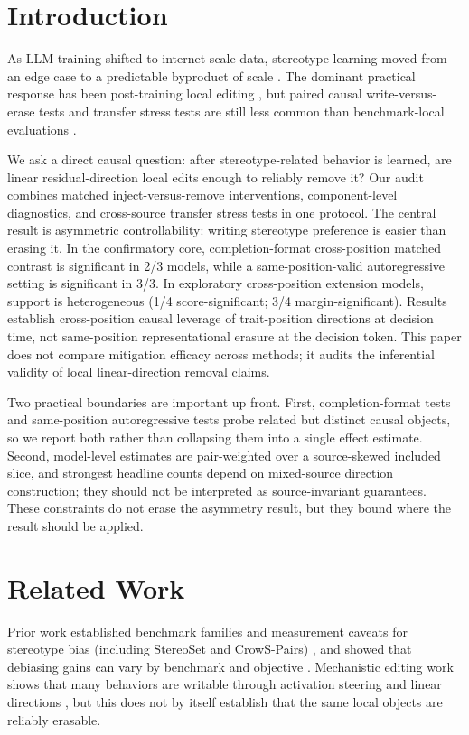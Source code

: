 \section{Introduction}
As LLM training shifted to internet-scale data, stereotype learning moved from an edge case to a predictable byproduct of scale \citep{nadeem2021stereoset,nangia2020crowspairs,blodgett2021salmon}. The dominant practical response has been post-training local editing \citep{vig2020causal,zou2023repeng,turner2023steering,tan2024steering}, but paired causal write-versus-erase tests and transfer stress tests are still less common than benchmark-local evaluations \citep{meade2022survey,morabito2023debiasing,jin2021transferability,reusens2023multilingual}.

We ask a direct causal question: after stereotype-related behavior is learned, are linear residual-direction local edits enough to reliably remove it? Our audit combines matched inject-versus-remove interventions, component-level diagnostics, and cross-source transfer stress tests in one protocol. The central result is asymmetric controllability: writing stereotype preference is easier than erasing it. In the confirmatory core, completion-format cross-position matched contrast is significant in 2/3 models, while a same-position-valid autoregressive setting is significant in 3/3. In exploratory cross-position extension models, support is heterogeneous (1/4 score-significant; 3/4 margin-significant). Results establish cross-position causal leverage of trait-position directions at decision time, not same-position representational erasure at the decision token.
This paper does not compare mitigation efficacy across methods; it audits the inferential validity of local linear-direction removal claims.

Two practical boundaries are important up front. First, completion-format tests and same-position autoregressive tests probe related but distinct causal objects, so we report both rather than collapsing them into a single effect estimate. Second, model-level estimates are pair-weighted over a source-skewed included slice, and strongest headline counts depend on mixed-source direction construction; they should not be interpreted as source-invariant guarantees. These constraints do not erase the asymmetry result, but they bound where the result should be applied.

\section{Related Work}
Prior work established benchmark families and measurement caveats for stereotype bias (including StereoSet and CrowS-Pairs) \citep{nadeem2021stereoset,nangia2020crowspairs,blodgett2021salmon}, and showed that debiasing gains can vary by benchmark and objective \citep{meade2022survey,morabito2023debiasing}. Mechanistic editing work shows that many behaviors are writable through activation steering and linear directions \citep{vig2020causal,zou2023repeng,turner2023steering}, but this does not by itself establish that the same local objects are reliably erasable.

